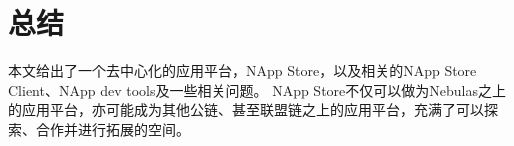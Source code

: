 \section{总结}
本文给出了一个去中心化的应用平台，NApp Store，以及相关的NApp Store Client、NApp dev tools及一些相关问题。
NApp Store不仅可以做为Nebulas之上的应用平台，亦可能成为其他公链、甚至联盟链之上的应用平台，充满了可以探索、合作并进行拓展的空间。

